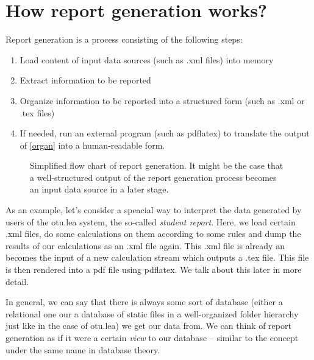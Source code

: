 \documentclass{scrartcl}
\begin{document}
\section{How report generation works?}
Report generation is a process consisting of the following steps:
\begin{enumerate}
\item Load content of input data sources (such as .xml files) into memory
\item Extract information to be reported
\item\label{organ} Organize information to be reported into a structured form (such as .xml or .tex files)
\item If needed, run an external program (such as pdflatex) to translate the output of \ref{organ} into a human-readable form. 
\end{enumerate}
\begin{figure}[t]
\begin{center}
\end{center}
\caption{Simplified flow chart of report generation. It might be the case that a well-structured output of the report generation process becomes an input data source in a later stage.
}
\end{figure}
As an example, let's consider a speacial way to interpret the data generated by users of the otu.lea system, the so-called \emph{student report}. Here, we load certain .xml files, do some calculations on them according to some rules and dump the results of our calculations as an .xml file again. This .xml file is already an becomes the input of a new calculation stream which outputs a .tex file. This file is then rendered into a pdf file using pdflatex. We talk about this later in more detail.

In general, we can say that there is always some sort of database (either a relational one our a database of static files in a well-organized folder hierarchy just like in the case of otu.lea) we get our data from. We can think of report generation as if it were a certain \emph{view} to our database -- similar to the concept under the same name in database theory.
\end{document}
